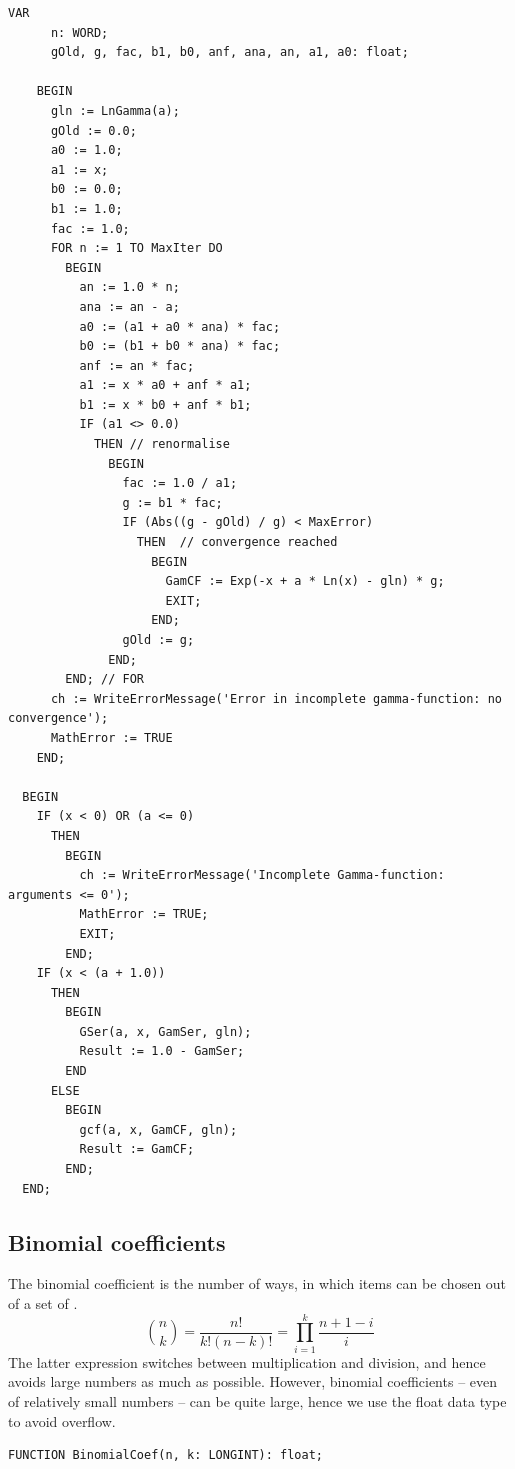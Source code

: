 \begin{refsection}
\begin{lstlisting}[caption=Incomplete gamma function]
    VAR
      n: WORD;
      gOld, g, fac, b1, b0, anf, ana, an, a1, a0: float;

    BEGIN
      gln := LnGamma(a);
      gOld := 0.0;
      a0 := 1.0;
      a1 := x;
      b0 := 0.0;
      b1 := 1.0;
      fac := 1.0;
      FOR n := 1 TO MaxIter DO
        BEGIN
          an := 1.0 * n;
          ana := an - a;
          a0 := (a1 + a0 * ana) * fac;
          b0 := (b1 + b0 * ana) * fac;
          anf := an * fac;
          a1 := x * a0 + anf * a1;
          b1 := x * b0 + anf * b1;
          IF (a1 <> 0.0)
            THEN // renormalise
              BEGIN
                fac := 1.0 / a1;
                g := b1 * fac;
                IF (Abs((g - gOld) / g) < MaxError)
                  THEN  // convergence reached
                    BEGIN
                      GamCF := Exp(-x + a * Ln(x) - gln) * g;
                      EXIT;
                    END;
                gOld := g;
              END;
        END; // FOR
      ch := WriteErrorMessage('Error in incomplete gamma-function: no convergence');
      MathError := TRUE
    END;

  BEGIN
    IF (x < 0) OR (a <= 0)
      THEN
        BEGIN
          ch := WriteErrorMessage('Incomplete Gamma-function: arguments <= 0');
          MathError := TRUE;
          EXIT;
        END;
    IF (x < (a + 1.0))
      THEN
        BEGIN
          GSer(a, x, GamSer, gln);
          Result := 1.0 - GamSer;
        END
      ELSE
        BEGIN
          gcf(a, x, GamCF, gln);
          Result := GamCF;
        END;
  END;
\end{lstlisting}

\subsection{Binomial coefficients}

The binomial coefficient is the number of ways, in which  items can be chosen out of a set of .
\begin{equation}
  \binom{n}{k} = \frac{n!}{k! (n-k)!} = \prod_{i=1}^k\frac{n + 1 -i}{i}
\end{equation}
The latter expression switches between multiplication and division, and hence avoids large numbers as much as possible. However, binomial coefficients -- even of relatively small numbers -- can be quite large, hence we use the float data type to avoid overflow.

\begin{lstlisting}[caption=binomial coefficient]
  FUNCTION BinomialCoef(n, k: LONGINT): float;


\end{lstlisting}
\end{refsection}
